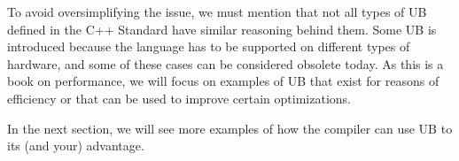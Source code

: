 To avoid oversimplifying the issue, we must mention that not all types of UB defined in the C++ Standard have similar reasoning behind them. Some UB is introduced because the language has to be supported on different types of hardware, and some of these cases can be considered obsolete today. As this is a book on performance, we will focus on examples of UB that exist for reasons of efficiency or that can be used to improve certain optimizations.

In the next section, we will see more examples of how the compiler can use UB to its (and your) advantage.




































